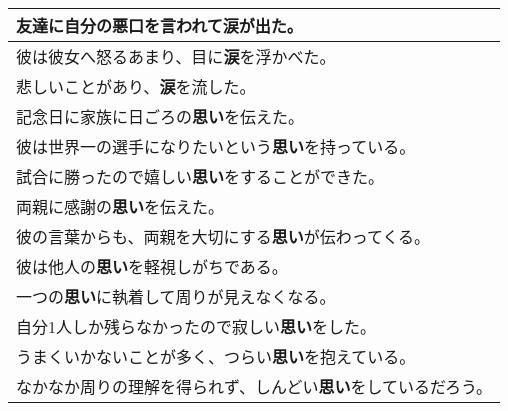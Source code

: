 \begin{longtable}[C]{|l|}
	\hline
	友達に自分の悪口を言われて\textbf{涙}が出た。\\
	\hline
	彼は彼女へ怒るあまり、目に\textbf{涙}を浮かべた。\\
	\hline
	悲しいことがあり、\textbf{涙}を流した。\\
	\hline
	記念日に家族に日ごろの\textbf{思い}を伝えた。\\
	\hline
	彼は世界一の選手になりたいという\textbf{思い}を持っている。\\
	\hline
	試合に勝ったので嬉しい\textbf{思い}をすることができた。\\
	\hline
	両親に感謝の\textbf{思い}を伝えた。\\
	\hline
	彼の言葉からも、両親を大切にする\textbf{思い}が伝わってくる。\\
	\hline
	彼は他人の\textbf{思い}を軽視しがちである。\\
	\hline
	一つの\textbf{思い}に執着して周りが見えなくなる。\\
	\hline
	自分1人しか残らなかったので寂しい\textbf{思い}をした。\\
	\hline
	うまくいかないことが多く、つらい\textbf{思い}を抱えている。\\
	\hline
	なかなか周りの理解を得られず、しんどい\textbf{思い}をしているだろう。\\
	\hline
\end{longtable}
